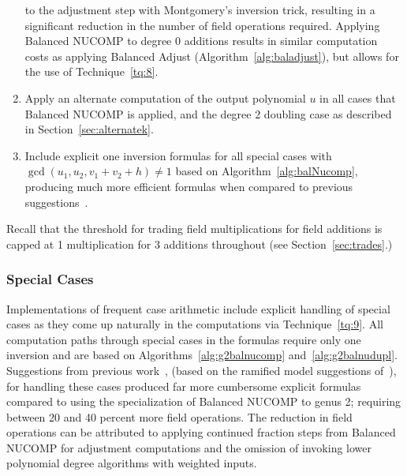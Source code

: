 \begin{enumerate}[label=T\arabic*]
to the adjustment step with Montgomery's inversion trick, resulting in a
significant reduction in the number of field operations required. Applying
Balanced NUCOMP to degree 0 additions results in similar computation costs as
applying Balanced Adjust (Algorithm~\ref{alg:baladjust}), but allows for the use
of Technique~\ref{tq:8}.
\item \label{tq:8} Apply an alternate computation of the output polynomial $u$
in all cases that Balanced NUCOMP is applied, and the degree 2 doubling case as
described in Section~\ref{sec:alternatek}.
\item \label{tq:9} 
Include explicit one inversion formulas for all special cases with $\gcd
(u_1,u_2,v_1 + v_2 + h) \not = 1$  based on Algorithm~\ref{alg:balNucomp},
producing much more efficient formulas when compared to previous
suggestions~\cite{EricksonJacobsonStein_realg2_2011}.
\end{enumerate}

Recall that the threshold for trading field multiplications for field additions is
capped at 1 multiplication for 3 additions throughout (see
Section~\ref{sec:trades}.)

\subsubsection{Special Cases}
Implementations of frequent case arithmetic include explicit handling of special
cases as they come up naturally in the computations via Technique~\ref{tq:9}.
All computation paths through special cases in the formulas require only one
inversion and are based on Algorithms~\ref{alg:g2balnucomp}
and~\ref{alg:g2balnudupl}. Suggestions from previous
work~\cite{EricksonJacobsonStein_realg2_2011}, (based on the ramified model
suggestions of~\cite{Lange_explicit_2005}), for handling these cases produced
far more cumbersome explicit formulas compared to using the specialization of
Balanced NUCOMP to genus 2; requiring between 20 and 40 percent more field operations. The
reduction in field operations can be attributed to applying continued fraction
steps from Balanced NUCOMP for adjustment computations and the omission of
invoking lower polynomial degree algorithms with weighted inputs.

